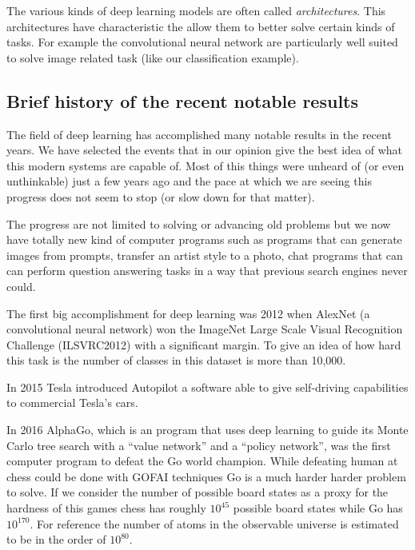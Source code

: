 \documentclass{report}
\begin{document}
The various kinds of deep learning models are often called \emph{architectures}.
This architectures have characteristic the allow them to better solve certain
kinds of tasks. For example the convolutional neural network are particularly
well suited to solve image related task (like our classification example).

\subsection{Brief history of the recent notable results}

The field of deep learning has accomplished many notable results in the recent
years. We have selected the events that in our opinion give the best idea of
what this modern systems are capable of. Most of this things were unheard of
(or even unthinkable) just a few years ago and the pace at which we are seeing
this progress does not seem to stop (or slow down for that matter).

The progress are not limited to solving or advancing old problems but we now
have totally new kind of computer programs such as programs that can generate
images from prompts, transfer an artist style to a photo, chat programs that
can can perform question answering tasks in a way that previous search engines
never could.

The first big accomplishment for deep learning was 2012 when AlexNet (a
convolutional neural network) won the ImageNet Large Scale Visual Recognition
Challenge (ILSVRC2012) with a significant margin. To give an idea of how hard
this task is the number of classes in this dataset is more than 10,000.

In 2015 Tesla introduced Autopilot a software able to give self-driving
capabilities to commercial Tesla's cars.

In 2016 AlphaGo, which is an program that uses deep learning to guide its Monte
Carlo tree search with a ``value network'' and a ``policy network'', was the
first computer program to defeat the Go world champion. While defeating human at
chess could be done with GOFAI techniques Go is a much harder harder problem to
solve. If we consider the number of possible board states as a proxy for the
hardness of this games chess has roughly $10^{45}$ possible board states while
Go has $10^{170}$. For reference the number of atoms in the observable universe
is estimated to be in the order of $10^{80}$.
\end{document}
